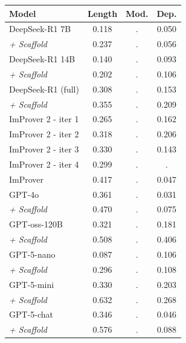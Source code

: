 \begin{tabular}{l|ccc}
\hline
\textbf{Model}  & \textbf{Length} & \textbf{Mod.} & \textbf{Dep.} \\
\hline
DeepSeek-R1 7B & 0.118 & . & 0.050 \\
\textit{+ Scaffold} & 0.237 & . & 0.056 \\
DeepSeek-R1 14B & 0.140 & . & 0.093 \\
\textit{+ Scaffold} & 0.202 & . & 0.106 \\
DeepSeek-R1 (full) & 0.308 & . & 0.153 \\
\textit{+ Scaffold} & 0.355 & . & 0.209 \\
\hdashline
ImProver 2 - iter 1 & 0.265 & . & 0.162 \\
ImProver 2 - iter 2 & 0.318 & . & 0.206 \\
ImProver 2 - iter 3 & 0.330 & . & 0.143 \\
ImProver 2 - iter 4 & 0.299 & . & . \\
\hdashline
ImProver & 0.417 & . & 0.047 \\
GPT-4o & 0.361 & . & 0.031 \\
\textit{+ Scaffold} & 0.470 & . & 0.075 \\
\hdashline
GPT-oss-120B & 0.321 & . & 0.181 \\
\textit{+ Scaffold} & 0.508 & . & 0.406 \\
GPT-5-nano & 0.087 & . & 0.106 \\
\textit{+ Scaffold} & 0.296 & . & 0.108 \\
GPT-5-mini & 0.330 & . & 0.203 \\
\textit{+ Scaffold} & 0.632 & . & 0.268 \\
GPT-5-chat & 0.346 & . & 0.046 \\
\textit{+ Scaffold} & 0.576 & . & 0.088 \\
\hline
\end{tabular}
